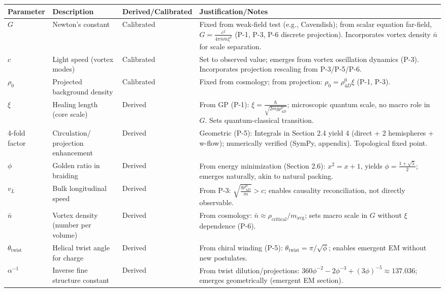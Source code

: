 \begin{table}[H]
\centering
\small
\begin{tabularx}{\linewidth}{|p{1.5cm}|p{2cm}|l|Y|}
\hline
Parameter & Description & Derived/Calibrated & Justification/Notes \\
\hline
$G$ & Newton's constant & Calibrated & Fixed from weak-field test (e.g., Cavendish); from scalar equation far-field, $G = \frac{c^2}{4\pi \bar{n} \bar{m} \xi^2}$ (P-1, P-3, P-6 discrete projection). Incorporates vortex density $\bar{n}$ for scale separation. \\
\hline
$c$ & Light speed (vortex modes) & Calibrated & Set to observed value; emerges from vortex oscillation dynamics (P-3). Incorporates projection rescaling from P-3/P-5/P-6. \\
\hline
$\rho_0$ & Projected background density & Calibrated & Fixed from cosmology; from projection: $\rho_0 = \rho_{4D}^0 \xi$ (P-1, P-3). \\
\hline
$\xi$ & Healing length (core scale) & Derived & From GP (P-1): $\xi = \frac{\hbar}{\sqrt{2 m g \rho_{4D}^0}}$; microscopic quantum scale, no macro role in $G$. Sets quantum-classical transition. \\
-fold factor & Circulation/ projection enhancement & Derived & Geometric (P-5): Integrals in Section 2.4 yield 4 (direct + 2 hemispheres + w-flow); numerically verified (SymPy, appendix). Topological fixed point. \\
\hline
$\phi$ & Golden ratio in braiding & Derived & From energy minimization (Section 2.6): $x^2 = x + 1$, yields $\phi = \frac{1 + \sqrt{5}}{2}$; emerges naturally, akin to natural packing. \\
\hline
$v_L$ & Bulk longitudinal speed & Derived & From P-3: $\sqrt{\frac{g \rho_{4D}^0}{m}} > c$; enables causality reconciliation, not directly observable. \\
\hline
$\bar{n}$ & Vortex density (number per volume) & Derived & From cosmology: $\bar{n} \approx \rho_{\text{critical}} / m_{\text{avg}}$; sets macro scale in $G$ without $\xi$ dependence (P-6). \\
\hline
$\theta_{\text{twist}}$ & Helical twist angle for charge & Derived & From chiral winding (P-5): $\theta_{\text{twist}} = \pi / \sqrt{\phi}$; enables emergent EM without new postulates. \\
\hline
$\alpha^{-1}$ & Inverse fine structure constant & Derived & From twist dilution/projections: $360 \phi^{-2} - 2 \phi^{-3} + (3 \phi)^{-5} \approx 137.036$; emerges geometrically (emergent EM section). \\

\end{tabularx}
\end{table}
